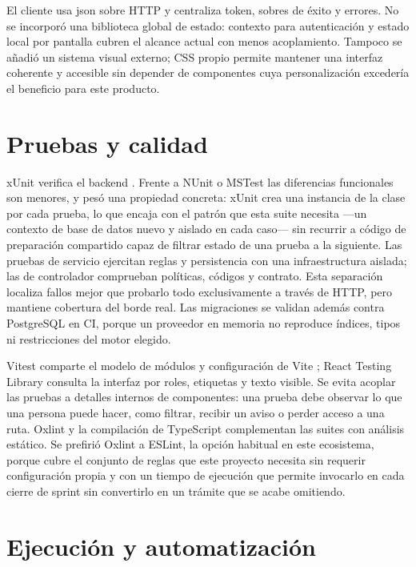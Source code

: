 El cliente usa \gls{json} sobre HTTP y centraliza token, sobres de éxito y errores. No se incorporó una biblioteca global de estado: contexto para autenticación y estado local por pantalla cubren el alcance actual con menos acoplamiento. Tampoco se añadió un sistema visual externo; CSS propio permite mantener una interfaz coherente y accesible sin depender de componentes cuya personalización excedería el beneficio para este producto.

\section{Pruebas y calidad}

xUnit verifica el backend \cite{xunit}. Frente a NUnit o MSTest las diferencias funcionales son menores, y pesó una propiedad concreta: xUnit crea una instancia de la clase por cada prueba, lo que encaja con el patrón que esta suite necesita ---un contexto de base de datos nuevo y aislado en cada caso--- sin recurrir a código de preparación compartido capaz de filtrar estado de una prueba a la siguiente. Las pruebas de servicio ejercitan reglas y persistencia con una infraestructura aislada; las de controlador comprueban políticas, códigos y contrato. Esta separación localiza fallos mejor que probarlo todo exclusivamente a través de HTTP, pero mantiene cobertura del borde real. Las migraciones se validan además contra PostgreSQL en CI, porque un proveedor en memoria no reproduce índices, tipos ni restricciones del motor elegido.

Vitest comparte el modelo de módulos y configuración de Vite \cite{vitest}; React Testing Library consulta la interfaz por roles, etiquetas y texto visible. Se evita acoplar las pruebas a detalles internos de componentes: una prueba debe observar lo que una persona puede hacer, como filtrar, recibir un aviso o perder acceso a una ruta. Oxlint y la compilación de TypeScript complementan las suites con análisis estático. Se prefirió Oxlint a ESLint, la opción habitual en este ecosistema, porque cubre el conjunto de reglas que este proyecto necesita sin requerir configuración propia y con un tiempo de ejecución que permite invocarlo en cada cierre de sprint sin convertirlo en un trámite que se acabe omitiendo.

\section{Ejecución y automatización}

